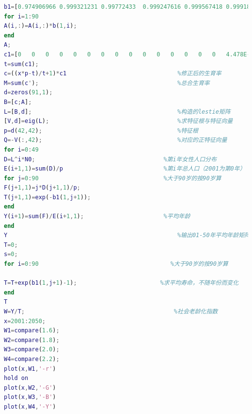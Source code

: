 \documentclass{whutmod}
\begin{document}
\begin{lstlisting}[language=matlab]
b1=[0.974906966 0.999321231 0.99772433  0.999247616 0.999567418 0.999180663 0.999887948 0.999387596 0.999618586 0.999985672 0.999389434 0.999724354 0.999801796 0.999627626 0.999704795 0.999639686 0.999728462 0.999974533 0.999173327 0.998954118 0.999441067 0.999357392 0.999290675 0.998999176 0.999881604 0.998896347 0.998355939 0.999135339 0.999074527 0.998872652 0.999180794 0.998918159 0.999046112 0.999042354 0.999396027 0.998624972 0.998252716 0.999597855 0.998710945 0.999003274 0.999443444 0.999141415 0.998772101 0.998940505 0.997905005 0.998374562 0.997783774 0.997596666 0.997344906 0.996954499 0.996669784 0.996030759 0.995006639 0.996157488 0.994647744 0.995779435 0.995652313 0.99577713  0.992477806 0.994969564 0.988130537 0.989284868 0.988703961 0.988302563 0.98420824  0.984495416 0.985298735 0.980062089 0.978928307 0.977358446 0.971126989 0.969303899 0.969979818 0.96405059  0.961740312 0.96729706  0.948302346 0.946571559 0.949641387 0.935949391 0.912489482 0.9261805   0.923757863 0.928757906 0.918230333 0.887761389 0.885306858 0.875178086 0.882495752 0.824428701 0.7717624];
for i=1:90
A(i,:)=A(i,:)*b(1,i);
end
A;         
c1=[0   0   0   0   0   0   0   0   0   0   0   0   0   0   0   4.478E-05   0.000322169 0.000358246 0.001004604 0.004683367 0.011011165 0.033616492 0.057875394 0.074871727 0.069182006 0.076039141 0.06724895  0.052429406 0.043732464 0.034350502 0.024632733 0.023252532 0.018343847 0.014701275 0.011039961 0.007117557 0.005094843 0.00359291  0.002514858 0.002484781 0.001764709 0.001471644 0.000676953 0.000265476 0.000401474 0.000408779 0.000110447 0.000192401 0.000389421 0.000224069 0   0   0   0   0   0   0   0   0   0   0   0   0   0   0   0   0   0   0   0   0   0   0   0   0   0   0   0   0   0   0   0   0   0   0   0   0   0   0   0];        %由2001年原始数据得到的生育率
t=sum(c1);
c=((x*p-t)/t+1)*c1                                %修正后的生育率
M=sum(c');                                        %总合生育率
d=zeros(91,1);
B=[c;A];
L=[B,d];                                          %构造的lestie矩阵
[V,d]=eig(L);                                     %求特征根与特征向量
p=d(42,42);                                       %特征根
Q=-V(:,42);                                       %对应的正特征向量
for i=0:49
D=L^i*N0;                                     %第i年女性人口分布
E(i+1,1)=sum(D)/p                             %第i年总人口（2001为第0年）
for j=0:90                                    %大于90岁的按90岁算
F(j+1,1)=j*D(j+1,1)/p;
T(j+1,1)=exp(-b1(1,j+1));                 
end
Y(i+1)=sum(F)/E(i+1,1);                       %平均年龄
end
Y                                                 %输出01-50年平均年龄矩阵
T=0;
s=0;
for i=0:90                                      %大于90岁的按90岁算

T=T+exp(b1(1,j+1)-1);                        %求平均寿命，不随年份而变化
end
T
W=Y/T;                                           %社会老龄化指数
x=2001:2050;
W1=compare(1.6);
W2=compare(1.8);
W3=compare(2.0);
W4=compare(2.2);
plot(x,W1,'-r')
hold on
plot(x,W2,'-G')
plot(x,W3,'-B')
plot(x,W4,'-Y')

\end{lstlisting}
\end{document}
